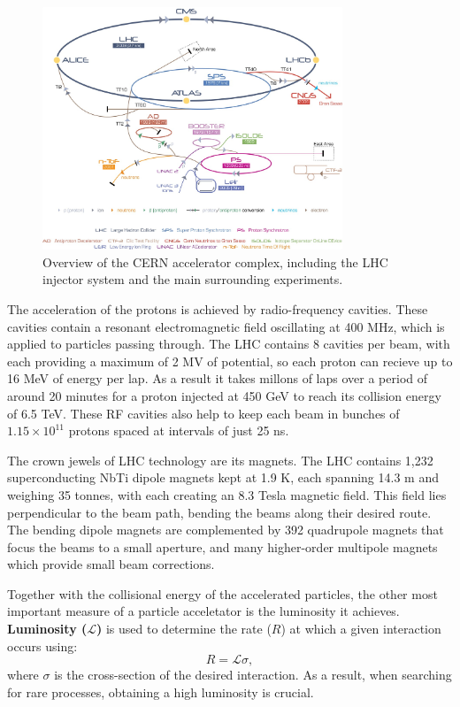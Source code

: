 \begin{figure}[h!]
    \centering
    \includegraphics[width=0.8\textwidth]{Figures/2/cern_complex.png}
    \caption{Overview of the CERN accelerator complex, including the LHC injector system and the main surrounding experiments.}
    \label{fig:lhc_injector}
\end{figure}

The acceleration of the protons is achieved by radio-frequency cavities. These cavities contain a resonant electromagnetic field oscillating at 400 MHz, which is applied to particles passing through. The LHC contains 8 cavities per beam, with each providing a maximum of 2 MV of potential, so each proton can recieve up to 16 MeV of energy per lap. As a result it takes millons of laps over a period of around 20 minutes for a proton injected at 450 GeV to reach its collision energy of 6.5 TeV.  These RF cavities also help to keep each beam in bunches of $1.15 \times 10^{11}$ protons spaced at intervals of just 25 ns.

The crown jewels of LHC technology are its magnets. The LHC contains 1,232 superconducting NbTi dipole magnets kept at 1.9 K, each spanning 14.3 m and weighing 35 tonnes, with each creating an 8.3 Tesla magnetic field. This field lies perpendicular to the beam path, bending the beams along their desired route. The bending dipole magnets are complemented by 392 quadrupole magnets that focus the beams to a small aperture, and many higher-order multipole magnets which provide small beam corrections.

Together with the collisional energy of the accelerated particles, the other most important measure of a particle acceletator is the luminosity it achieves. \textbf{Luminosity ($\mathcal{L}$)} is used to determine the rate ($R$) at which a given interaction occurs using:
\begin{equation}
R = \mathcal{L}\sigma,
\end{equation}
where $\sigma$ is the cross-section of the desired interaction. As a result, when searching for rare processes, obtaining a high luminosity is crucial.

